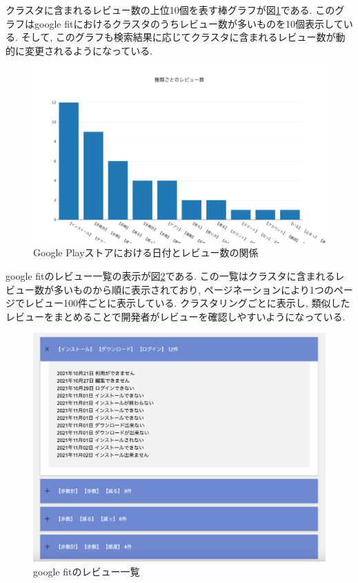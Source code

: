 クラスタに含まれるレビュー数の上位10個を表す棒グラフが図\ref{fig:top10}である. このグラフはgoogle fitにおけるクラスタのうちレビュー数が多いものを10個表示している. 
そして, このグラフも検索結果に応じてクラスタに含まれるレビュー数が動的に変更されるようになっている. 

\begin{figure}[H]
  \centering
  \includegraphics[scale=0.3]
    {contents/images/top10.png}
  \caption{Google Playストアにおける日付とレビュー数の関係\label{fig:top10}}
\end{figure}

google fitのレビュー一覧の表示が図\ref{fig:review_items}である. この一覧はクラスタに含まれるレビュー数が多いものから順に表示されており, ページネーションにより1つのページでレビュー100件ごとに表示している. 
クラスタリングごとに表示し, 類似したレビューをまとめることで開発者がレビューを確認しやすいようになっている. 

\begin{figure}[H]
  \centering
  \includegraphics[scale=0.3]
    {contents/images/review_items.png}
  \caption{google fitのレビュー一覧\label{fig:review_items}}
\end{figure}

